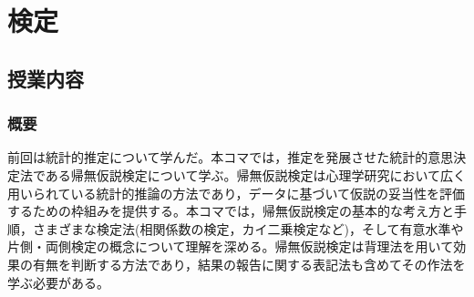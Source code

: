 \section{検定}
\label{b13_NHST}

\subsection{授業内容}
\subsubsection{概要}
前回は統計的推定について学んだ。本コマでは，推定を発展させた統計的意思決定法である帰無仮説検定について学ぶ。帰無仮説検定は心理学研究において広く用いられている統計的推論の方法であり，データに基づいて仮説の妥当性を評価するための枠組みを提供する。本コマでは，帰無仮説検定の基本的な考え方と手順，さまざまな検定法(相関係数の検定，カイ二乗検定など)，そして有意水準や片側・両側検定の概念について理解を深める。帰無仮説検定は背理法を用いて効果の有無を判断する方法であり，結果の報告に関する表記法も含めてその作法を学ぶ必要がある。

